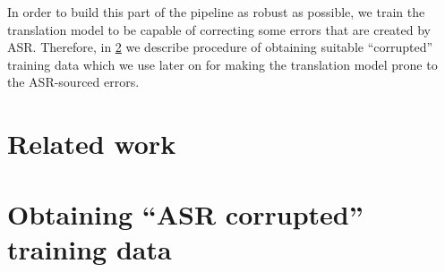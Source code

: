 In order to build this part of the pipeline as robust as possible, we train the translation model to be capable of correcting some errors that are created by ASR. Therefore, in \cref{sec:asr_corrupted} we describe procedure of obtaining suitable ``corrupted'' training data which we use later on for making the translation model prone to the ASR-sourced errors.

\section{Related work}

\section{Obtaining ``ASR corrupted'' training data}
\label{sec:asr_corrupted}

